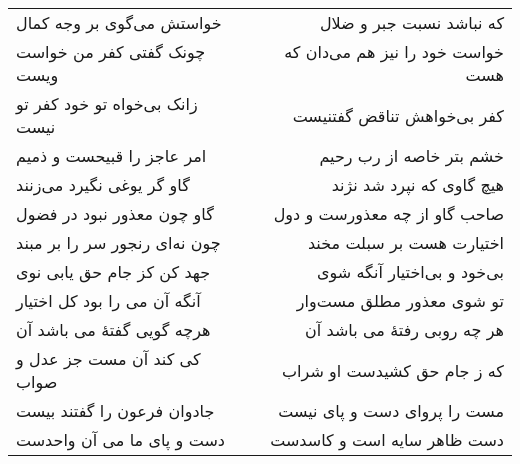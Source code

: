 \begin{center}
\begin{longtable}{l p{0.5cm} r}
\\
خواستش می‌گوی بر وجه کمال
&&
که نباشد نسبت جبر و ضلال
\\
چونک گفتی کفر من خواست ویست
&&
خواست خود را نیز هم می‌دان که هست
\\
زانک بی‌خواه تو خود کفر تو نیست
&&
کفر بی‌خواهش تناقض گفتنیست
\\
امر عاجز را قبیحست و ذمیم
&&
خشم بتر خاصه از رب رحیم
\\
گاو گر یوغی نگیرد می‌زنند
&&
هیچ گاوی که نپرد شد نژند
\\
گاو چون معذور نبود در فضول
&&
صاحب گاو از چه معذورست و دول
\\
چون نه‌ای رنجور سر را بر مبند
&&
اختیارت هست بر سبلت مخند
\\
جهد کن کز جام حق یابی نوی
&&
بی‌خود و بی‌اختیار آنگه شوی
\\
آنگه آن می را بود کل اختیار
&&
تو شوی معذور مطلق مست‌وار
\\
هرچه گویی گفتهٔ می باشد آن
&&
هر چه روبی رفتهٔ می باشد آن
\\
کی کند آن مست جز عدل و صواب
&&
که ز جام حق کشیدست او شراب
\\
جادوان فرعون را گفتند بیست
&&
مست را پروای دست و پای نیست
\\
دست و پای ما می آن واحدست
&&
دست ظاهر سایه است و کاسدست
\\
\end{longtable}
\end{center}
